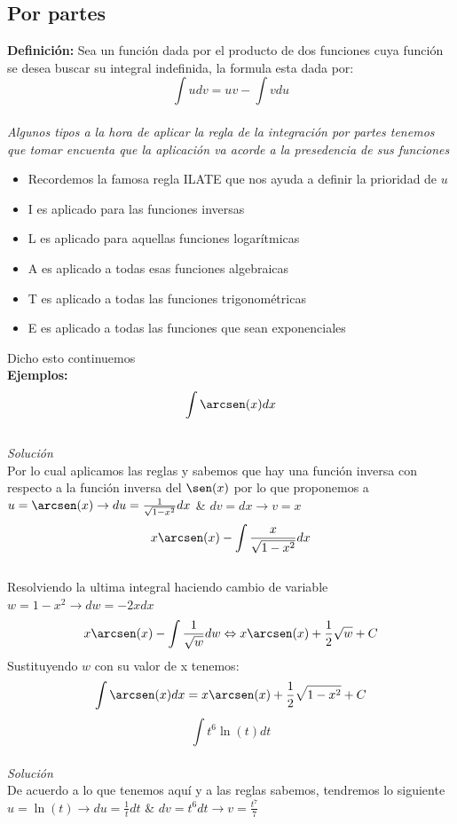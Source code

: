 \documentclass[10pt]{article}
\begin{document}
\subsection{Por partes}
\textbf{Definición:} Sea un función dada por el producto de dos funciones cuya función se desea buscar su integral indefinida, la formula esta dada por:\\
\[\int u dv = uv - \int vdu\]\\
\emph{Algunos tipos a la hora de aplicar la regla de la integración por partes tenemos que tomar encuenta que la aplicación va acorde a la presedencia de sus funciones}
\begin{itemize}
  \item Recordemos la famosa regla ILATE que nos ayuda a definir la prioridad de $u$
  \item I es aplicado para las funciones inversas
  \item L es aplicado para aquellas funciones logarítmicas
  \item A es aplicado a todas esas funciones algebraicas
  \item T es aplicado a todas las funciones trigonométricas
  \item E es aplicado a todas las funciones que sean exponenciales
\end{itemize}
Dicho esto continuemos\\
\textbf{Ejemplos:}\\
\[\int \arcsen(x)dx\]\\
\textit{Solución}\\
Por lo cual aplicamos las reglas y sabemos que hay una función inversa con respecto a la función inversa del $\sen(x)$ por lo que proponemos a $u=\arcsen(x)\rightarrow du = \frac{1}{\sqrt{1-x^{2}}}dx$ \& $dv=dx \rightarrow v=x$
\\
\[x\arcsen(x)-\int \frac{x}{\sqrt{1-x^{2}}}dx\]\\
Resolviendo la ultima integral haciendo cambio de variable $w=1-x^{2} \rightarrow dw=-2x dx$\\
\[x\arcsen(x)-\int \frac{1}{\sqrt{w}}dw \Leftrightarrow x\arcsen(x)+\frac{1}{2}\sqrt{w} + C\]
Sustituyendo $w$ con su valor de x tenemos:
\[\int \arcsen(x)dx=x\arcsen(x)+\frac{1}{2}\sqrt{1-x^{2}}+C\]
\vspace{1cm}
\[\int t^{6}\ln(t)dt\]\\
\textit{Solución}\\
De acuerdo a lo que tenemos aquí y a las reglas sabemos, tendremos lo siguiente $u=\ln(t) \rightarrow du=\frac{1}{t}dt$ \& $dv=t^{6}dt \rightarrow v=\frac{t^7}{7}$\\
\end{document}
